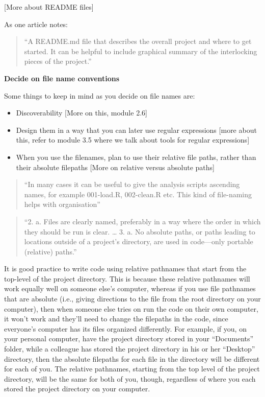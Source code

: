 \documentclass[]{tufte-book}
\providecommand{\tightlist}{%
  \setlength{\itemsep}{0pt}\setlength{\parskip}{0pt}}
\begin{document}
{[}More about README files{]}

As one article notes:

\begin{quote}
``A README.md file that describes the overall project and where to get started.
It can be helpful to include graphical summary of the interlocking pieces of the
project.'' \citep{marwick2018packaging}
\end{quote}

\textbf{Decide on file name conventions}

Some things to keep in mind as you decide on file names are:

\begin{itemize}
\tightlist
\item
  Discoverability {[}More on this, module 2.6{]}
\item
  Design them in a way that you can later use regular expressions {[}more
  about this, refer to module 3.5 where we talk about tools for regular
  expressions{]}
\item
  When you use the filenames, plan to use their relative file paths, rather
  than their absolute filepaths {[}More on relative versus absolute paths{]}
\end{itemize}

\begin{quote}
``In many cases it can be useful to give the analysis scripts ascending names, for example 001-load.R, 002-clean.R etc. This kind of file-naming helps with organisation'' \citep{marwick2018packaging}
\end{quote}

\begin{quote}
``2. a. Files are clearly named, preferably in a way where the order in which they should be run is clear.
\ldots{}
3. a. No absolute paths, or paths leading to locations outside of a project's directory, are used in code---only portable (relative) paths.'' \citep{bertin2021creating}
\end{quote}

It is good practice to write code using relative pathnames that start from the
top-level of the project directory. This is because these relative pathnames
will work equally well on someone else's computer, whereas if you use file
pathnames that are absolute (i.e., giving directions to the file from the root
directory on your computer), then when someone else tries on run the code on
their own computer, it won't work and they'll need to change the filepaths in
the code, since everyone's computer has its files organized differently. For
example, if you, on your personal computer, have the project directory stored in
your ``Documents'' folder, while a colleague has stored the project directory in
his or her ``Desktop'' directory, then the absolute filepaths for each file in the
directory will be different for each of you. The relative pathnames, starting
from the top level of the project directory, will be the same for both of you,
though, regardless of where you each stored the project directory on your
computer.
\end{document}

